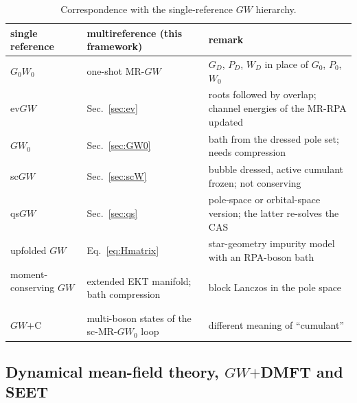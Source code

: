 \documentclass[11pt,a4paper]{article}
\newcommand{\GW}{$GW$}
\newcommand{\MRGW}{MR-$GW$}
\begin{document}
\begin{table}[h!]
\centering
\small
\begin{tabular}{>{\raggedright\arraybackslash}p{4.4cm}>{\raggedright\arraybackslash}p{5.0cm}>{\raggedright\arraybackslash}p{5.4cm}}
\toprule
single reference & multireference (this framework) & remark\\
\midrule
$G_0W_0$ & one-shot \MRGW{}~\cite{WFL2026} & $G_D$, $P_D$, $W_D$ in place of $G_0$, $P_0$, $W_0$\\
ev\GW{} & Sec.~\ref{sec:ev} & roots followed by overlap; channel energies of the MR-RPA updated\\
$GW_0$ & Sec.~\ref{sec:GW0} & bath from the dressed pole set; needs compression\\
sc\GW{} & Sec.~\ref{sec:scW} & bubble dressed, active cumulant frozen; not conserving\\
qs\GW{} & Sec.~\ref{sec:qs} & pole-space or orbital-space version; the latter re-solves the CAS\\
upfolded \GW{}~\cite{BintrimBerkelbach2021} & Eq.~\eqref{eq:Hmatrix} & star-geometry impurity model with an RPA-boson bath\\
moment-conserving \GW{}~\cite{MCGW2023} & extended EKT manifold; bath compression & block Lanczos in the pole space\\
\GW{}$+$C~\cite{Aryasetiawan1996} & multi-boson states of the sc-MR-$GW_0$ loop & different meaning of ``cumulant''\\
\bottomrule
\end{tabular}
\caption{Correspondence with the single-reference \GW{} hierarchy.}
\label{tab:gwfamily}
\end{table}

\subsection{Dynamical mean-field theory, \GW{}$+$DMFT and SEET}
\end{document}
